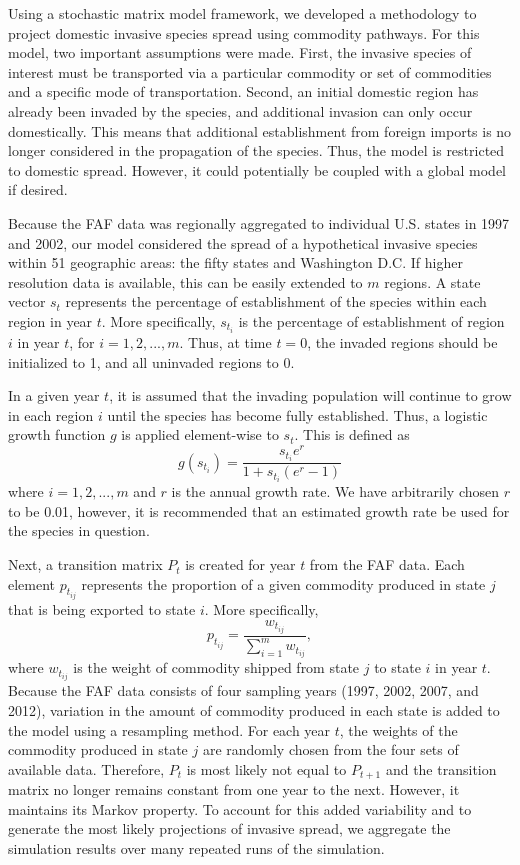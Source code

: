 \documentclass[12pt]{article}
\begin{document}
Using a stochastic matrix model framework, we developed a methodology to project domestic invasive species spread using commodity pathways.  For this model, two important assumptions were made.  First, the invasive species of interest must be transported via a particular commodity or set of commodities and a specific mode of transportation.  Second, an initial domestic region has already been invaded by the species, and additional invasion can only occur domestically.  This means that additional establishment from foreign imports is no longer considered in the propagation of the species.  Thus, the model is restricted to domestic spread. However, it could potentially be coupled with a global model if desired.

Because the FAF data was regionally aggregated to  individual U.S. states in 1997 and 2002, our model considered the spread of a hypothetical invasive species within 51 geographic areas: the fifty states and Washington D.C.  If higher resolution data is available, this can be easily extended to $m$ regions.  A state vector $s_t$ represents the percentage of establishment of the species within each region in year $t$.  More specifically, $s_{t_i}$ is the percentage of establishment of region $i$ in year $t$, for $i = 1,2,..., m$.  Thus, at time $t=0$, the invaded regions should be initialized to 1, and all uninvaded regions to 0.    

In a given year $t$, it is assumed that the invading population will continue to grow in each region $i$ until the species has become fully established.  Thus, a logistic growth function $g$ is applied element-wise to $s_t$.  This is defined as
\[ 
	g(s_{t_i}) = \frac{s_{t_i} e^r}{1+s_{t_i} (e^r-1)}
\]
where $i=1,2,...,m$ and $r$ is the annual growth rate.  We have arbitrarily chosen $r$ to be 0.01, however, it is recommended that an estimated growth rate be used for the species in question.

Next, a transition matrix $P_t$ is created for year $t$ from the FAF data.  Each element $p_{t_{ij}}$ represents the proportion of a given commodity produced in state $j$ that is being exported to state $i$.  More specifically, 
\[
p_{t_{ij}} = \frac{w_{t_{ij}}}{\sum_{i=1}^{m} w_{t_{ij}}},  
\]
where $w_{t_{ij}}$ is the weight of commodity shipped from state $j$ to state $i$ in year $t$.  Because the FAF data consists of four sampling years (1997, 2002, 2007, and 2012), variation in the amount of commodity produced in each state is added to the model using a resampling method.  For each year $t$, the weights of the commodity produced in state $j$ are randomly chosen from the four sets of available data.  Therefore, $P_t$ is most likely not equal to $P_{t+1}$ and the transition matrix no longer remains constant from one year to the next.  However, it maintains its Markov property.  To account for this added variability and to generate the most likely projections of invasive spread, we aggregate the simulation results over many repeated runs of the simulation.
\end{document}
